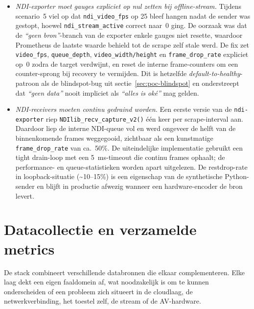 \begin{itemize}
  \item \emph{NDI-exporter moet gauges expliciet op nul zetten bij offline-stream.} Tijdens scenario~5 viel op dat \texttt{ndi\_video\_fps} op 25 bleef hangen nadat de sender was gestopt, hoewel \texttt{ndi\_stream\_active} correct naar~0 ging. De oorzaak was dat de \emph{``geen bron''}-branch van de exporter enkele gauges niet resette, waardoor Prometheus de laatste waarde behield tot de scrape zelf stale werd. De fix zet \texttt{video\_fps}, \texttt{queue\_depth}, \texttt{video\_width/height} en \texttt{frame\_drop\_rate} expliciet op~0 zodra de target verdwijnt, en reset de interne frame-counters om een counter-sprong bij recovery te vermijden. Dit is hetzelfde \emph{default-to-healthy}-patroon als de blindspot-bug uit sectie~\ref{sec:poc-blindspot} en onderstreept dat \emph{``geen data''} nooit impliciet als \emph{``alles is oké''} mag gelden.
  \item \emph{NDI-receivers moeten continu gedraind worden.} Een eerste versie van de \texttt{ndi-exporter} riep \texttt{NDIlib\_recv\_capture\_v2()} één keer per scrape-interval aan. Daardoor liep de interne NDI-queue vol en werd ongeveer de helft van de binnenkomende frames weggegooid, zichtbaar als een kunstmatige \texttt{frame\_drop\_rate} van ca.\ 50\%. De uiteindelijke implementatie gebruikt een tight drain-loop met een 5~ms-timeout die continu frames ophaalt; de performance- en queue-statistieken worden apart uitgelezen. De restdrop-rate in loopback-situatie (\textasciitilde{}10--15\%) is een eigenschap van de synthetische Python-sender en blijft in productie afwezig wanneer een hardware-encoder de bron levert.
\end{itemize}

\section{Datacollectie en verzamelde metrics}
\label{sec:poc-metrics}

De stack combineert verschillende databronnen die elkaar complementeren. Elke laag dekt een eigen faaldomein af, wat noodzakelijk is om te kunnen onderscheiden of een probleem zich situeert in de cloudlaag, de netwerkverbinding, het toestel zelf, de stream of de AV-hardware.

